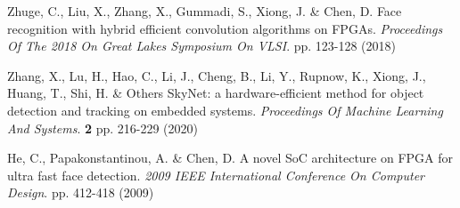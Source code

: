 \documentclass[runningheads]{llncs}
\begin{document}
\begin{thebibliography}{10}
Zhuge, C., Liu, X., Zhang, X., Gummadi, S., Xiong, J. \& Chen, D. Face recognition with hybrid efficient convolution algorithms on FPGAs. {\em Proceedings Of The 2018 On Great Lakes Symposium On VLSI}. pp. 123-128 (2018)

Zhang, X., Lu, H., Hao, C., Li, J., Cheng, B., Li, Y., Rupnow, K., Xiong, J., Huang, T., Shi, H. \& Others SkyNet: a hardware-efficient method for object detection and tracking on embedded systems. {\em Proceedings Of Machine Learning And Systems}. \textbf{2} pp. 216-229 (2020)

He, C., Papakonstantinou, A. \& Chen, D. A novel SoC architecture on FPGA for ultra fast face detection. {\em 2009 IEEE International Conference On Computer Design}. pp. 412-418 (2009)

\end{thebibliography}
\end{document}
